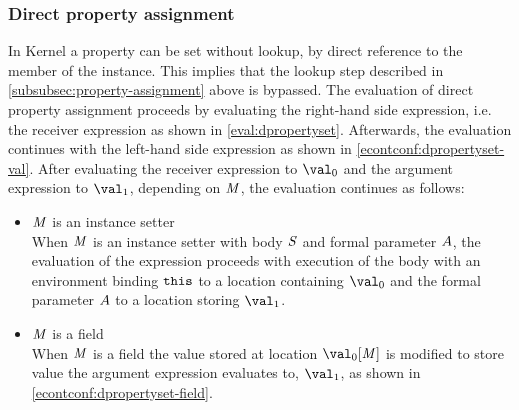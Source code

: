\documentclass{article}
\begin{document}
\subsubsection{Direct property assignment}
\label{subsubsec:direct-property-assignment}
In Kernel a property can be set without lookup, by direct reference to the member of the instance.
This implies that the lookup step described in \ref{subsubsec:property-assignment} above is bypassed.
The evaluation of direct property assignment proceeds by evaluating the right-hand side expression, i.e. the receiver expression as shown in \eqref{eval:dpropertyset}.
Afterwards, the evaluation continues with the left-hand side expression as shown in \eqref{econtconf:dpropertyset-val}.
After evaluating the receiver expression to $\val_0$ and the argument expression to $\val_1$, depending on $\mathit{M}$, the evaluation continues as follows:
\begin{itemize}
\item $\mathit{M}$ is an instance setter\\
When $\mathit{M}$ is an instance setter with body $\mathit{S}$ and formal parameter $A$, the evaluation of the expression proceeds with execution of the body with an environment binding $\tt{this}$ to a location containing $\val_0$ and the formal parameter $A$ to a location storing $\val_1$.
\item $\mathit{M}$ is a field\\
When $\mathit{M}$ is a field the value stored at location $\val_0[\membermeta]$ is modified to store value the argument expression evaluates to, $\val_1$, as shown in \eqref{econtconf:dpropertyset-field}.
\end{itemize}
\end{document}
